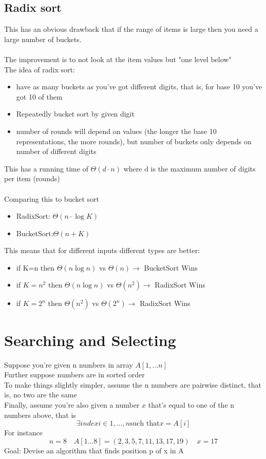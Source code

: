 \documentclass{article}[18pt]
\begin{document}
\subsection{Radix sort}
This has an obvious drawback that if the range of items is large then you need a large number of buckets.\\
\\
The improvement is to not look at the item values but "one level below"\\
The idea of radix sort:
\begin{itemize}
	\item have as many buckets as you've got different digits, that is, for base 10 you've got 10 of them
	\item Repeatedly bucket sort by given digit
	\item number of rounds will depend on values (the longer the base 10 representations, the more rounds), but number of buckets only depends on number of different digits
\end{itemize}
This has a running time of $\Theta(d\cdot n)$ where d is the maximum number of digits per item (rounds)\\
\\
Comparing this to bucket sort
\begin{itemize}
	\item RadixSort: $\Theta (n\cdot \log K)$
	\item BucketSort:$\Theta (n+K)$
\end{itemize}
This means that for different inputs different types are better:
\begin{itemize}
	\item if K=n  then $\Theta (n\log n)$ vs $\Theta (n)\rightarrow$ BucketSort Wins
	\item if $K=n^2$ then $\Theta (n\log n)$ vs $\Theta (n^2)\rightarrow$ RadixSort Wins
	\item if $K=2^n$ then $\Theta(n^2)$ vs $\Theta(2^n)\rightarrow$ RadixSort Wins 
\end{itemize}
\section{Searching and Selecting}
Suppose you're given n numbers in array $A[1,...n]$\\
Further suppose numbers are in sorted order\\
To make things slightly simpler, assume the n numbers are pairwise distinct, that is, no two are the same\\
Finally, assume you're also given a number $x$ that's equal to one of the n numbers above, that is
$$\exists index i \in {1,...,n} \text{such that} x=A[i]$$
For instance
$$n=8 \quad A[1...8]=(2,3,5,7,11,13,17,19) \quad x=17$$
Goal: Devise an algorithm that finds position p of x in A
\end{document}
